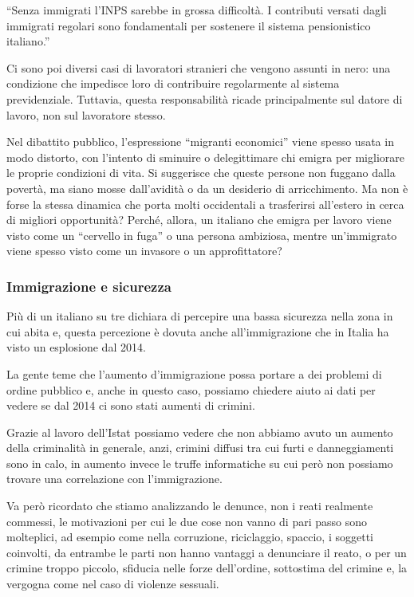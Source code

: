 \documentclass[12pt]{book} %
\begin{document}
“Senza immigrati l’INPS sarebbe in grossa difficoltà. I contributi versati dagli immigrati regolari sono fondamentali per sostenere il sistema pensionistico italiano.”

Ci sono poi diversi casi di lavoratori stranieri che vengono assunti in nero: una condizione che impedisce loro di contribuire regolarmente al sistema previdenziale. Tuttavia, questa responsabilità ricade principalmente sul datore di lavoro, non sul lavoratore stesso.

Nel dibattito pubblico, l’espressione “migranti economici” viene spesso usata in modo distorto, con l’intento di sminuire o delegittimare chi emigra per migliorare le proprie condizioni di vita. Si suggerisce che queste persone non fuggano dalla povertà, ma siano mosse dall’avidità o da un desiderio di arricchimento.
Ma non è forse la stessa dinamica che porta molti occidentali a trasferirsi all’estero in cerca di migliori opportunità? Perché, allora, un italiano che emigra per lavoro viene visto come un “cervello in fuga” o una persona ambiziosa, mentre un'immigrato viene spesso visto come un invasore o un approfittatore?

\subsubsection{Immigrazione e sicurezza}
Più di un italiano su tre dichiara di percepire una bassa sicurezza nella zona in cui abita e, questa percezione è dovuta anche
all'immigrazione che in Italia ha visto un esplosione dal
2014.

La gente teme che l'aumento d'immigrazione possa portare a dei problemi di
ordine pubblico e, anche in questo caso, possiamo chiedere aiuto ai dati per vedere se dal 2014 ci sono stati aumenti
di crimini.

Grazie al lavoro dell'Istat possiamo vedere
che non abbiamo avuto un aumento della criminalità in generale, anzi, crimini diffusi tra cui furti e danneggiamenti
sono in calo, in aumento invece le truffe informatiche su cui però non possiamo trovare una correlazione con
l'immigrazione.

Va però ricordato che stiamo analizzando le denunce, non i reati realmente commessi, le motivazioni per cui le due cose
non vanno di pari passo sono molteplici, ad esempio come nella corruzione, riciclaggio, spaccio, i soggetti coinvolti,
da entrambe le parti non hanno vantaggi a denunciare il reato, o per un crimine troppo piccolo, sfiducia nelle forze
dell'ordine, sottostima del crimine e, la vergogna come nel caso di violenze sessuali.
\end{document}
